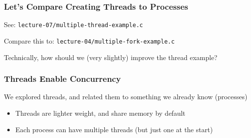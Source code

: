   \begin{frame}
    \frametitle{Let's Compare Creating Threads to Processes}

    See: \texttt{lecture-07/multiple-thread-example.c}

    \vspace{2em}

    Compare this to: \texttt{lecture-04/multiple-fork-example.c}

    \vspace{2em}

    Technically, how should we (very slightly) improve the thread example?
  \end{frame}

  \begin{frame}
    \frametitle{Threads Enable Concurrency}

    We explored threads, and related them to something we already know (processes)
    \begin{itemize}
      \item Threads are lighter weight, and share memory by default
      \item Each process can have multiple threads (but just one at the start)
    \end{itemize}
  \end{frame}

